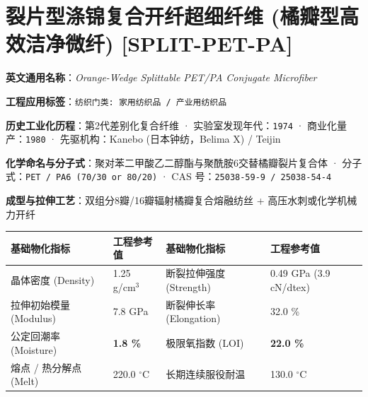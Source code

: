 \documentclass[11pt,openright,twoside,UTF8]{ctexbook}
\begin{document}
\section{裂片型涤锦复合开纤超细纤维 (橘瓣型高效洁净微纤) [SPLIT-PET-PA]}
\label{sec:split-pet-pa}

\noindent\textbf{英文通用名称}：\textit{Orange-Wedge Splittable PET/PA Conjugate Microfiber}\par
\noindent\textbf{工程应用标签}：\texttt{纺织门类: 家用纺织品 / 产业用纺织品}\par
\noindent\textbf{历史工业化历程}：第2代差别化复合纤维 · 实验室发现年代：\texttt{1974} · 商业化量产：\texttt{1980} · 先驱机构：Kanebo (日本钟纺，Belima X) / Teijin\par
\noindent\textbf{化学命名与分子式}：聚对苯二甲酸乙二醇酯与聚酰胺6交替橘瓣裂片复合体 · 分子式：\texttt{PET / PA6 (70/30 or 80/20)} · CAS 号：\texttt{25038-59-9 / 25038-54-4}\par
\noindent\textbf{成型与拉伸工艺}：双组分8瓣/16瓣辐射橘瓣复合熔融纺丝 + 高压水刺或化学机械力开纤\par

\vspace{0.15cm}
\begin{center}
\small
\begin{tabularx}{\textwidth}{p{3.8cm}Xp{3.8cm}X}
\toprule
\textbf{基础物化指标} & \textbf{工程参考值} & \textbf{基础物化指标} & \textbf{工程参考值} \\
\midrule
晶体密度 (Density) & 1.25 g/cm$^3$ & 断裂拉伸强度 (Strength) & 0.49 GPa (3.9 cN/dtex) \\
拉伸初始模量 (Modulus) & 7.8 GPa & 断裂伸长率 (Elongation) & 32.0 \% \\
公定回潮率 (Moisture) & \textbf{1.8 \%} & 极限氧指数 (LOI) & \textbf{22.0 \%} \\
熔点 / 热分解点 (Melt) & 220.0 $^\circ\mathrm{C}$ & 长期连续服役耐温 & 130.0 $^\circ\mathrm{C}$ \\
\bottomrule
\end{tabularx}
\end{center}
\vspace{0.15cm}
\end{document}
